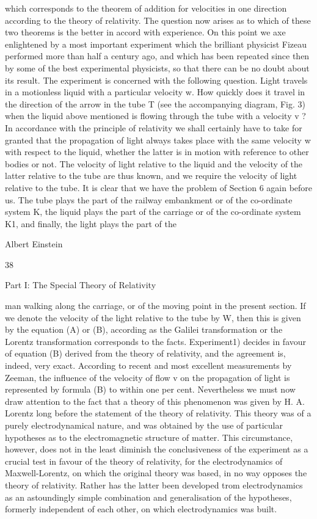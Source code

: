 \documentclass{article}
\begin{document}
which corresponds to the theorem of addition for velocities in one direction according to the
theory of relativity. The question now arises as to which of these two theorems is the better
in accord with experience. On this point we axe enlightened by a most important
experiment which the brilliant physicist Fizeau performed more than half a century ago, and
which has been repeated since then by some of the best experimental physicists, so that
there can be no doubt about its result. The experiment is concerned with the following
question. Light travels in a motionless liquid with a particular velocity w. How quickly does
it travel in the direction of the arrow in the tube T (see the accompanying diagram, Fig. 3)
when the liquid above mentioned is flowing through the tube with a velocity v ?
In accordance with the principle of relativity we shall certainly have to take for granted
that the propagation of light always takes place with the same velocity w with respect to the
liquid, whether the latter is in motion with reference to other bodies or not. The velocity of
light relative to the liquid and the velocity of the latter relative to the tube are thus known,
and we require the velocity of light relative to the tube.
It is clear that we have the problem of Section 6 again before us. The tube plays the part
of the railway embankment or of the co-ordinate system K, the liquid plays the part of the
carriage or of the co-ordinate system K1, and finally, the light plays the part of the

Albert Einstein

38

Part I: The Special Theory of Relativity

man walking along the carriage, or of the moving point in the present section. If we denote
the velocity of the light relative to the tube by W, then this is given by the equation (A) or
(B), according as the Galilei transformation or the Lorentz transformation corresponds to
the facts. Experiment1) decides in favour of equation (B) derived from the theory of
relativity, and the agreement is, indeed, very exact. According to recent and most excellent
measurements by Zeeman, the influence of the velocity of flow v on the propagation of
light is represented by formula (B) to within one per cent.
Nevertheless we must now draw attention to the fact that a theory of this phenomenon
was given by H. A. Lorentz long before the statement of the theory of relativity. This theory
was of a purely electrodynamical nature, and was obtained by the use of particular
hypotheses as to the electromagnetic structure of matter. This circumstance, however, does
not in the least diminish the conclusiveness of the experiment as a crucial test in favour of
the theory of relativity, for the electrodynamics of Maxwell-Lorentz, on which the original
theory was based, in no way opposes the theory of relativity. Rather has the latter been
developed trom electrodynamics as an astoundingly simple combination and generalisation
of the hypotheses, formerly independent of each other, on which electrodynamics was built.
\end{document}
